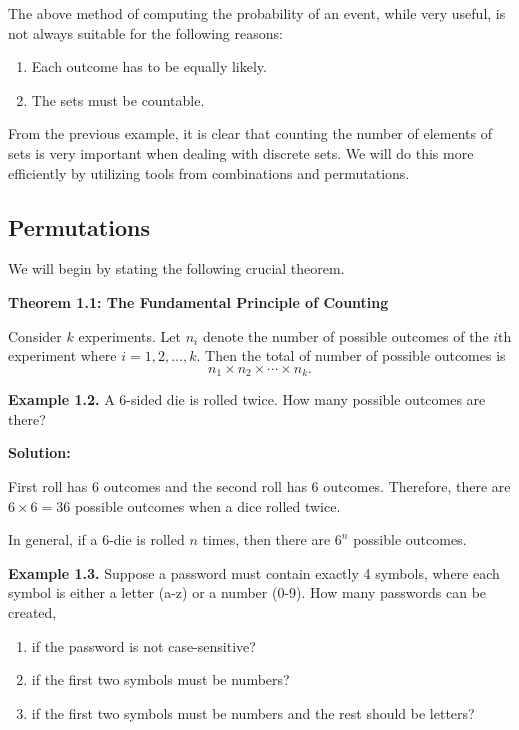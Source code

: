 \documentclass[
  12pt,
]{krantzNoCorner}
\providecommand{\tightlist}{%
  \setlength{\itemsep}{0pt}\setlength{\parskip}{0pt}}
\begin{document}
The above method of computing the probability of an event, while very
useful, is not always suitable for the following reasons:

\begin{enumerate}
\def\labelenumi{\arabic{enumi}.}
\tightlist
\item
  Each outcome has to be equally likely.
\item
  The sets must be countable.
\end{enumerate}

From the previous example, it is clear that counting the number of
elements of sets is very important when dealing with discrete sets. We
will do this more efficiently by utilizing tools from combinations and
permutations.

\hypertarget{permutations}{%
\subsection{Permutations}\label{permutations}}

We will begin by stating the following crucial theorem.

\textbf{Theorem 1.1: The Fundamental Principle of Counting}

Consider \(k\) experiments. Let \(n_i\) denote the number of possible
outcomes of the \(i\)th experiment where \(i=1,2,\dots,k.\) Then the total
of number of possible outcomes is
\[n_1\times n_2\times\cdots\times n_k.\]

\textbf{Example 1.2.} A 6-sided die is rolled twice. How many possible
outcomes are there?

\textbf{Solution:}

First roll has 6 outcomes and the second roll has 6 outcomes. Therefore,
there are \(6\times 6 = 36\) possible outcomes when a dice rolled twice.

In general, if a 6-die is rolled \(n\) times, then there are \(6^n\)
possible outcomes.

\textbf{Example 1.3.} Suppose a password must contain exactly 4 symbols,
where each symbol is either a letter (a-z) or a number (0-9). How many
passwords can be created,

\begin{enumerate}
\def\labelenumi{\arabic{enumi}.}
\tightlist
\item
  if the password is not case-sensitive?
\item
  if the first two symbols must be numbers?
\item
  if the first two symbols must be numbers and the rest should be
  letters?
\end{enumerate}
\end{document}

